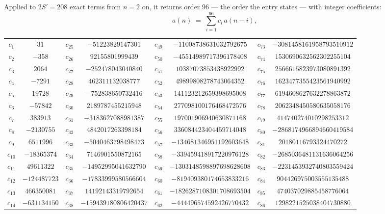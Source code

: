 \documentclass[11pt,a4paper]{article}
\theoremstyle{plain}
\theoremstyle{definition}
\begin{document}
Applied to $2S'=208$ exact terms from $n=2$ on, it returns order $96$ --- the
order the entry states --- with integer coefficients:
\[
a(n)\;=\;\sum_{i=1}^{96}c_i\,a(n-i),
\]
\begin{center}\small
\begin{tabular}{cccccccc}
$c_{1}$ & $31$ & $c_{25}$ & $-51223829147301$ & $c_{49}$ & $-11008738631032792675$ & $c_{73}$ & $-3081458161958793510912$ \\
$c_{2}$ & $-358$ & $c_{26}$ & $92155801999439$ & $c_{50}$ & $-45514989717396178408$ & $c_{74}$ & $1530690632562302255104$ \\
$c_{3}$ & $2064$ & $c_{27}$ & $-252478043040840$ & $c_{51}$ & $10387073853438922992$ & $c_{75}$ & $2566615823973080891392$ \\
$c_{4}$ & $-7291$ & $c_{28}$ & $462311132038777$ & $c_{52}$ & $49899808278743064352$ & $c_{76}$ & $1623477355423561940992$ \\
$c_{5}$ & $19728$ & $c_{29}$ & $-752838650732416$ & $c_{53}$ & $141123212659398695008$ & $c_{77}$ & $6194608627632278863872$ \\
$c_{6}$ & $-57842$ & $c_{30}$ & $2189787455215948$ & $c_{54}$ & $277098100176468472576$ & $c_{78}$ & $2062348450580635058176$ \\
$c_{7}$ & $383913$ & $c_{31}$ & $-3183627088981387$ & $c_{55}$ & $197001906940630871168$ & $c_{79}$ & $414740274010298253312$ \\
$c_{8}$ & $-2130755$ & $c_{32}$ & $4842017263398184$ & $c_{56}$ & $336084423404459714048$ & $c_{80}$ & $-2868174966894660419584$ \\
$c_{9}$ & $6511996$ & $c_{33}$ & $-5040463798498473$ & $c_{57}$ & $-134681346951192603648$ & $c_{81}$ & $20180116793324470272$ \\
$c_{10}$ & $-18365374$ & $c_{34}$ & $7146901550872165$ & $c_{58}$ & $-339459418917220976128$ & $c_{82}$ & $-2685036481131636064256$ \\
$c_{11}$ & $49611322$ & $c_{35}$ & $-14952995041632790$ & $c_{59}$ & $-1303148598897698628608$ & $c_{83}$ & $-2231453932740803559424$ \\
$c_{12}$ & $-124487723$ & $c_{36}$ & $-17833999580566604$ & $c_{60}$ & $-819409380174653833216$ & $c_{84}$ & $904426975003555135488$ \\
$c_{13}$ & $466350081$ & $c_{37}$ & $14192143319792654$ & $c_{61}$ & $-1826287108301708693504$ & $c_{85}$ & $474037029885458776064$ \\
$c_{14}$ & $-631134150$ & $c_{38}$ & $-159439180806420437$ & $c_{62}$ & $-444496574592426770432$ & $c_{86}$ & $1298221525038404730880$ \\

\end{tabular}
\end{center}
\end{document}
